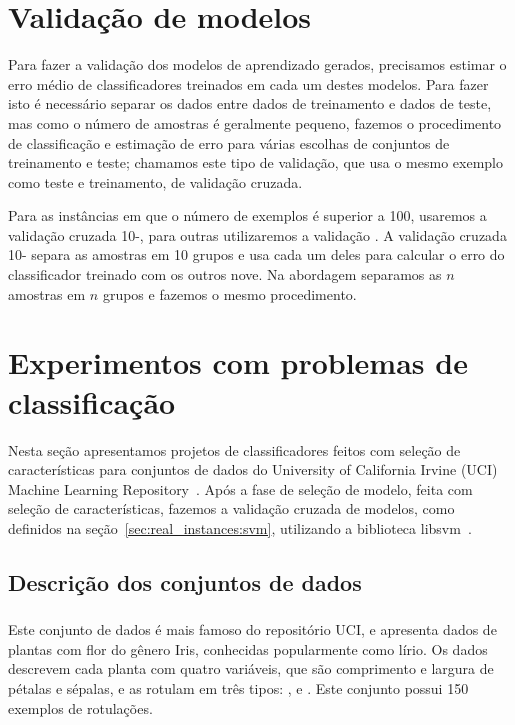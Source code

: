 \section{Validação de modelos}
Para fazer a validação dos modelos de aprendizado gerados, precisamos
estimar o erro médio de classificadores treinados em cada um destes
modelos. Para fazer isto é necessário separar os dados entre dados de
treinamento e dados de teste, mas como o número de amostras é geralmente
pequeno, fazemos o procedimento de classificação e estimação de erro
para várias escolhas de conjuntos de treinamento e teste; chamamos este
tipo de validação, que usa o mesmo exemplo como teste e treinamento, de
validação cruzada.

Para as instâncias em que o número de exemplos é superior a 100, 
usaremos a validação cruzada 10-, para outras 
utilizaremos a validação . A validação
cruzada 10- separa as amostras em 10 grupos e usa
cada um deles para calcular o erro do classificador treinado com os 
outros nove. Na abordagem  separamos as
$n$ amostras em $n$ grupos e fazemos o mesmo procedimento.

\section{Experimentos com problemas de classificação}
Nesta seção apresentamos projetos de classificadores feitos
com seleção de características para conjuntos de dados do University of 
California Irvine (UCI) Machine Learning Repository~\cite{Lic13}. Após 
a fase de seleção de modelo, feita com seleção de características, 
fazemos a validação cruzada de modelos, como definidos na 
seção~\ref{sec:real_instances:svm}, utilizando a biblioteca 
libsvm~\cite{CL11}.

\subsection{Descrição dos conjuntos de dados}
\subsubsection{}
Este conjunto de dados é mais famoso do repositório UCI, e apresenta 
dados de plantas com flor do gênero Iris, conhecidas popularmente como 
lírio. Os dados descrevem cada planta com quatro variáveis, que são 
comprimento e largura de pétalas e sépalas, e as rotulam em três tipos:
,  e 
. Este conjunto possui 150 exemplos de 
rotulações.

